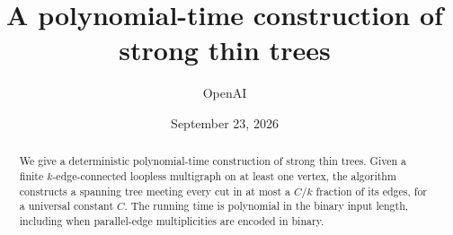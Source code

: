 \documentclass[11pt]{article}
\title{A polynomial-time construction of strong thin trees}
\author{OpenAI}
\date{September 23, 2026}
\begin{document}
\maketitle
\begin{abstract}
We give a deterministic polynomial-time construction of strong thin trees.
Given a finite $k$-edge-connected loopless multigraph on at least one vertex,
the algorithm constructs a spanning tree meeting every cut in at most a
$C/k$ fraction of its edges, for a universal constant $C$. The running time
is polynomial in the binary input length, including when parallel-edge
multiplicities are encoded in binary.
\end{abstract}
\tableofcontents







\appendix



\end{document}
